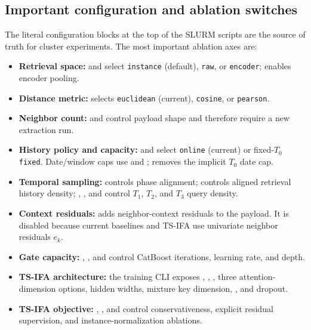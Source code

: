 \documentclass[11pt]{article}
\newcommand{\method}[1]{\texttt{#1}}
\begin{document}
\subsection{Important configuration and ablation switches}

The literal configuration blocks at the top of the SLURM scripts are the
source of truth for cluster experiments.  The most important ablation axes are:

\begin{itemize}
  \item \textbf{Retrieval space:}  and
   select \method{instance} (default), \method{raw}, or
  \method{encoder};  enables encoder pooling.
  \item \textbf{Distance metric:}  selects
  \method{euclidean} (current), \method{cosine}, or \method{pearson}.
  \item \textbf{Neighbor count:}  and 
  control payload shape and therefore require a new extraction run.
  \item \textbf{History policy and capacity:}  and
   select \method{online} (current) or fixed-$T_0$
  \method{fixed}.  Date/window caps use  and
  ;  removes the implicit
  $T_0$ date cap.
  \item \textbf{Temporal sampling:}  controls phase alignment;
   controls aligned retrieval history density;
  , , and 
  control $T_1$, $T_2$, and $T_3$ query density.
  \item \textbf{Context residuals:}  adds
  neighbor-context residuals to the payload.  It is disabled because current
  baselines and TS-IFA use univariate neighbor residuals $e_k$.
  \item \textbf{Gate capacity:} ,
  , and  control CatBoost iterations,
  learning rate, and depth.
  \item \textbf{TS-IFA architecture:} the training CLI exposes
  , , , three
  attention-dimension options, hidden widths, mixture key dimension,
  , and dropout.
  \item \textbf{TS-IFA objective:} , , and
   control conservativeness, explicit residual
  supervision, and instance-normalization ablations.
\end{itemize}
\end{document}

